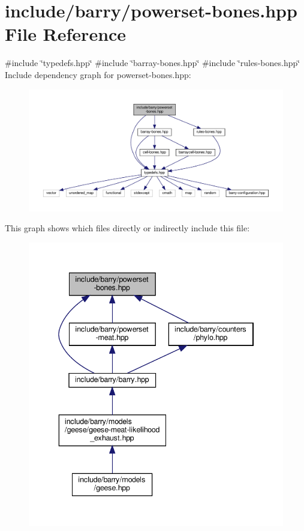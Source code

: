 \hypertarget{powerset-bones_8hpp}{}\section{include/barry/powerset-\/bones.hpp File Reference}
\label{powerset-bones_8hpp}
{\ttfamily \#include \char`\"{}typedefs.\+hpp\char`\"{}}\newline
{\ttfamily \#include \char`\"{}barray-\/bones.\+hpp\char`\"{}}\newline
{\ttfamily \#include \char`\"{}rules-\/bones.\+hpp\char`\"{}}\newline
Include dependency graph for powerset-\/bones.hpp\+:\nopagebreak
\begin{figure}[H]
\begin{center}
\leavevmode
\includegraphics[width=350pt]{powerset-bones_8hpp__incl}
\end{center}
\end{figure}
This graph shows which files directly or indirectly include this file\+:\nopagebreak
\begin{figure}[H]
\begin{center}
\leavevmode
\includegraphics[width=340pt]{powerset-bones_8hpp__dep__incl}
\end{center}
\end{figure}
